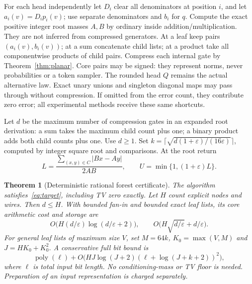 \documentclass[11pt]{article}
\newtheorem{theorem}{Theorem}
\begin{document}
For each head independently let $D_i$ clear all denominators at position $i$,
and let $a_i(v)=D_i p_i(v)$; use separate denominators and $b_i$ for $q$.
Compute the exact positive integer root masses $A,B$ by ordinary inside
addition/multiplication. They are not inferred from compressed generators.
At a leaf keep pairs $(a_i(v),b_i(v))$; at a sum concatenate child lists;
at a product take all componentwise products of child pairs. Compress each
internal gate by Theorem~\ref{thm:planar}.
Core pairs may be signed: they represent norms, never probabilities or a
token sampler. The rounded head $Q$ remains the actual alternative law.
Exact unary unions and singleton diagonal maps may pass through without
compression. If omitted from the error count, they contribute zero error;
all experimental methods receive these same shortcuts.

Let $d$ be the maximum number of compression gates in an expanded root
derivation: a sum takes the maximum child count plus one; a binary product
adds both child counts plus one. Use $d\geq1$. Set
$k=\lceil\sqrt{d(1+\varepsilon)/(16\varepsilon)}\rceil$, computed by integer square root and
comparisons. At the root return
\begin{equation}\label{eq:certificate}
 L=\frac{\sum_{(x,y)\in C}|Bx-Ay|}{2AB},
 \qquad U=\min\{1,(1+\varepsilon)L\}.
\end{equation}

\begin{theorem}[Deterministic rational forest certificate]\label{thm:forest}
The algorithm satisfies~\eqref{eq:target}, including TV zero exactly.
Let $H$ count explicit nodes and wires. Then $d\leq H$. With bounded fan-in
and bounded exact leaf lists, its core arithmetic cost and storage are
\[
 O\bigl(H(d/\varepsilon)\log(d/\varepsilon+2)\bigr),\qquad
 O\bigl(H\sqrt{d/\varepsilon}+d/\varepsilon\bigr).
\]
For general leaf lists of maximum size $V$, set
$M=64k$, $K_0=\max(V,M)$ and $J=HK_0+K_0^2$.
A conservative full bit bound is
\[
 \operatorname{poly}(\ell)+
 O\bigl(HJ\log(J+2)(\ell+\log(J+k+2))^2\bigr),
\]
where $\ell$ is total input bit length. No conditioning-mass or TV floor is
needed. Preparation of an input representation is charged separately.
\end{theorem}
\end{document}
